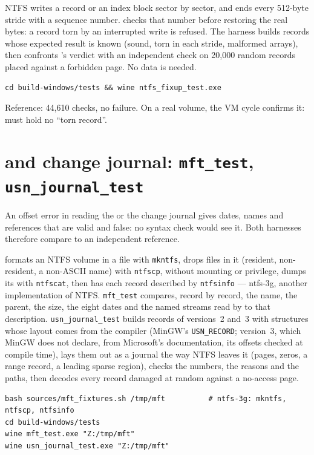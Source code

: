 \documentclass[11pt,a4paper,oneside]{report}
\begin{document}
NTFS writes a  record or an index block sector by sector,
and ends every 512-byte stride with a sequence number. \wac{} checks that
number before restoring the real bytes: a record torn by an interrupted write
is refused. The harness builds records whose expected result is known (sound,
torn in each stride, malformed arrays), then confronts \wac{}'s verdict with an
independent check on 20,000 random records placed against a forbidden page.
No data is needed.

\begin{lstlisting}
cd build-windows/tests && wine ntfs_fixup_test.exe
\end{lstlisting}

Reference: 44,610 checks, no failure. On a real volume, the VM cycle confirms
it:  must hold no ``torn record''.

\section{ and change journal: \texttt{mft\_test}, \texttt{usn\_journal\_test}}

An offset error in reading the  or the change journal gives
dates, names and references that are valid and false: no syntax check would
see it. Both harnesses therefore compare \wac{} to an independent reference.

 formats an NTFS volume in a file with
\texttt{mkntfs}, drops files in it (resident, non-resident, a non-ASCII name)
with \texttt{ntfscp}, without mounting or privilege, dumps its
 with \texttt{ntfscat}, then has each record described by
\texttt{ntfsinfo} — ntfs-3g, another implementation of NTFS.
\texttt{mft\_test} compares, record by record, the name, the parent, the
size, the eight dates and the named streams read by \wac{} to that
description. \texttt{usn\_journal\_test} builds records of versions~2 and~3
with structures whose layout comes from the compiler (MinGW's
\texttt{USN\_RECORD}; version~3, which MinGW does not declare, from
Microsoft's documentation, its offsets checked at compile time), lays them out
as a journal the way NTFS leaves it (pages, zeros, a range record, a leading
sparse region), checks the numbers, the reasons and the paths, then decodes
every record damaged at random against a no-access page.

\begin{lstlisting}
bash sources/mft_fixtures.sh /tmp/mft          # ntfs-3g: mkntfs, ntfscp, ntfsinfo
cd build-windows/tests
wine mft_test.exe "Z:/tmp/mft"
wine usn_journal_test.exe "Z:/tmp/mft"
\end{lstlisting}
\end{document}
